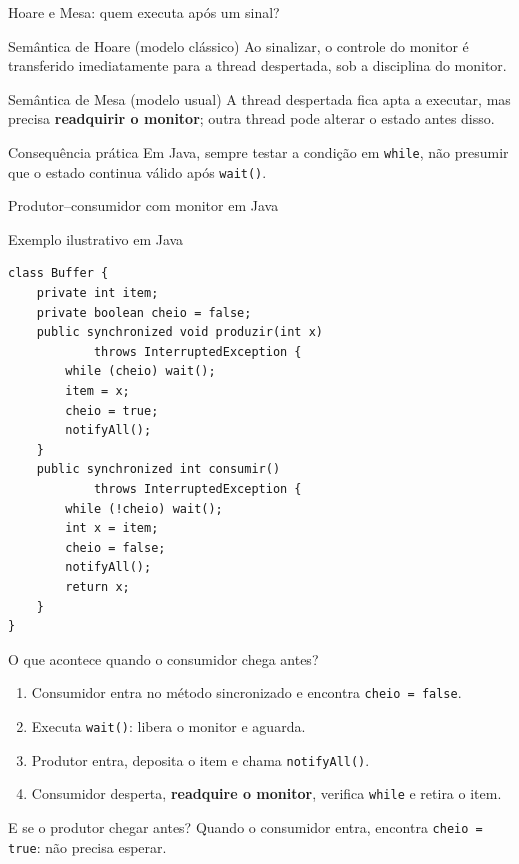 \documentclass[aspectratio=169,11pt]{beamer}
\begin{document}
\begin{frame}{Hoare e Mesa: quem executa após um sinal?}
\small
\begin{block}{Semântica de Hoare (modelo clássico)}
Ao sinalizar, o controle do monitor é transferido imediatamente para a thread despertada, sob a disciplina do monitor.
\end{block}
\begin{block}{Semântica de Mesa (modelo usual)}
A thread despertada fica apta a executar, mas precisa \textbf{readquirir o monitor}; outra thread pode alterar o estado antes disso.
\end{block}
\begin{alertblock}{Consequência prática}
Em Java, sempre testar a condição em \texttt{while}, não presumir que o estado continua válido após \texttt{wait()}.
\end{alertblock}
\end{frame}

\begin{frame}[fragile]{Produtor--consumidor com monitor em Java}
\scriptsize
\begin{block}{Exemplo ilustrativo em Java}
\begin{verbatim}
class Buffer {
    private int item;
    private boolean cheio = false;
    public synchronized void produzir(int x)
            throws InterruptedException {
        while (cheio) wait();
        item = x;
        cheio = true;
        notifyAll();
    }
    public synchronized int consumir()
            throws InterruptedException {
        while (!cheio) wait();
        int x = item;
        cheio = false;
        notifyAll();
        return x;
    }
}
\end{verbatim}
\end{block}
\end{frame}

\begin{frame}{O que acontece quando o consumidor chega antes?}
\small
\begin{enumerate}
\item Consumidor entra no método sincronizado e encontra \texttt{cheio = false}.
\item Executa \texttt{wait()}: libera o monitor e aguarda.
\item Produtor entra, deposita o item e chama \texttt{notifyAll()}.
\item Consumidor desperta, \textbf{readquire o monitor}, verifica \texttt{while} e retira o item.
\end{enumerate}
\begin{block}{E se o produtor chegar antes?}
Quando o consumidor entra, encontra \texttt{cheio = true}: não precisa esperar.
\end{block}
\end{frame}
\end{document}
